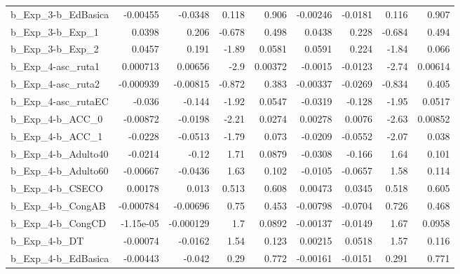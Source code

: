 \begin{tabular}{lrrrrrrrr}
b\_Exp\_3-b\_EdBasica         &    -0.00455 &      -0.0348 &     0.118 &    0.906 &   -0.00246 &     -0.0181 &        0.116 &         0.907 \\
b\_Exp\_3-b\_Exp\_1            &      0.0398 &        0.206 &    -0.678 &    0.498 &     0.0438 &       0.228 &       -0.684 &         0.494 \\
b\_Exp\_3-b\_Exp\_2            &      0.0457 &        0.191 &     -1.89 &   0.0581 &     0.0591 &       0.224 &        -1.84 &         0.066 \\
b\_Exp\_4-asc\_ruta1          &    0.000713 &      0.00656 &      -2.9 &  0.00372 &    -0.0015 &     -0.0123 &        -2.74 &       0.00614 \\
b\_Exp\_4-asc\_ruta2          &   -0.000939 &     -0.00815 &    -0.872 &    0.383 &   -0.00337 &     -0.0269 &       -0.834 &         0.405 \\
b\_Exp\_4-asc\_rutaEC         &      -0.036 &       -0.144 &     -1.92 &   0.0547 &    -0.0319 &      -0.128 &        -1.95 &        0.0517 \\
b\_Exp\_4-b\_ACC\_0            &    -0.00872 &      -0.0198 &     -2.21 &   0.0274 &    0.00278 &      0.0076 &        -2.63 &       0.00852 \\
b\_Exp\_4-b\_ACC\_1            &     -0.0228 &      -0.0513 &     -1.79 &    0.073 &    -0.0209 &     -0.0552 &        -2.07 &         0.038 \\
b\_Exp\_4-b\_Adulto40         &     -0.0214 &        -0.12 &      1.71 &   0.0879 &    -0.0308 &      -0.166 &         1.64 &         0.101 \\
b\_Exp\_4-b\_Adulto60         &    -0.00667 &      -0.0436 &      1.63 &    0.102 &    -0.0105 &     -0.0657 &         1.58 &         0.114 \\
b\_Exp\_4-b\_CSECO            &     0.00178 &        0.013 &     0.513 &    0.608 &    0.00473 &      0.0345 &        0.518 &         0.605 \\
b\_Exp\_4-b\_CongAB           &   -0.000784 &     -0.00696 &      0.75 &    0.453 &   -0.00798 &     -0.0704 &        0.726 &         0.468 \\
b\_Exp\_4-b\_CongCD           &   -1.15e-05 &    -0.000129 &       1.7 &   0.0892 &   -0.00137 &     -0.0149 &         1.67 &        0.0958 \\
b\_Exp\_4-b\_DT               &    -0.00074 &      -0.0162 &      1.54 &    0.123 &    0.00215 &      0.0518 &         1.57 &         0.116 \\
b\_Exp\_4-b\_EdBasica         &    -0.00443 &       -0.042 &      0.29 &    0.772 &   -0.00161 &     -0.0151 &        0.291 &         0.771 \\

\end{tabular}
